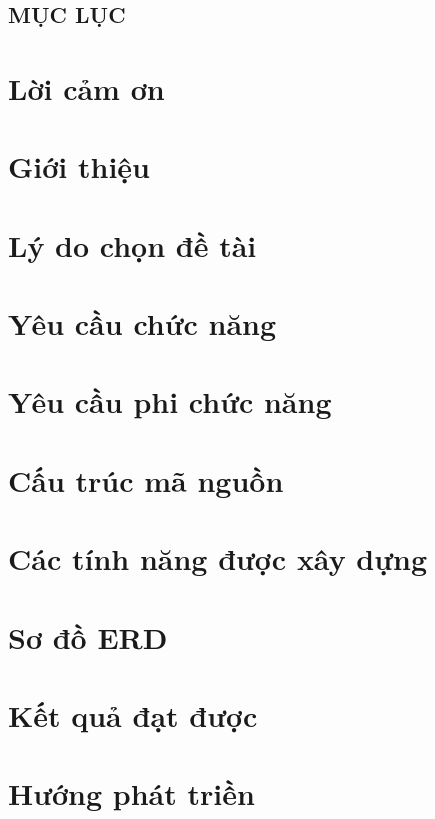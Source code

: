 \documentclass[a4paper,12pt]{report}
\begin{document}


\newpage

\section*{MỤC LỤC}
\tableofcontents %

\newpage

\chapter{Lời cảm ơn}\label{sec:thanks}


\chapter{Giới thiệu}\label{sec:introduction}


\chapter{Lý do chọn đề tài}\label{sec:reason}


\chapter{Yêu cầu chức năng}\label{sec:functional-requirements}


\chapter{Yêu cầu phi chức năng}\label{sec:non-functional-requirements}



\chapter{Cấu trúc mã nguồn}


\chapter{Các tính năng được xây dựng}


\chapter{Sơ đồ ERD}


\chapter{Kết quả đạt được}


\chapter{Hướng phát triền}

\end{document}
